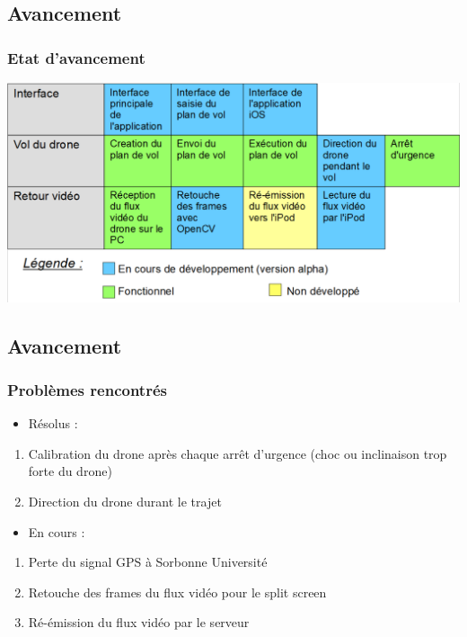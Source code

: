 \documentclass{beamer}
\begin{document}

	\begin{frame}
		\section{Avancement}
		\begin{center}
		\frametitle{Etat d'avancement}
         \includegraphics[scale=0.35]{Avancement_projet.PNG}
        \end{center}
	\end{frame}
	
	
	\begin{frame}
		\section{Avancement}
		\begin{center}
		\frametitle{Problèmes rencontrés}
	    \begin{itemize}
                 \item Résolus :
            \end{itemize}
        \begin{enumerate}
             
            \item Calibration du drone après chaque arrêt d'urgence (choc ou inclinaison trop forte du drone)
             \item Direction du drone durant le trajet
             \end{enumerate}
            \begin{itemize}
                \item En cours :
            \end{itemize}
            \begin{enumerate}
           \item Perte du signal GPS à Sorbonne Université
           \item Retouche des frames du flux vidéo pour le split screen
           \item Ré-émission du flux vidéo par le serveur
           \end{enumerate}
		\end{center}
	\end{frame}

	
\end{document}
